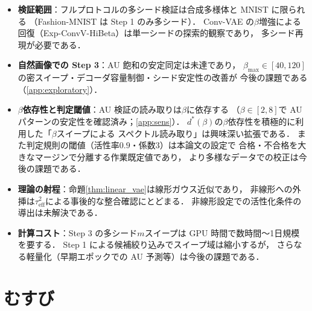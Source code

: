 \documentclass[11pt,a4paper]{jsarticle}
\newcommand{\dstar}{d^{*}(\beta)}
\begin{document}
\begin{itemize}
  \item \textbf{検証範囲}：フルプロトコルの多シード検証は合成多様体と MNIST に限られる
        （Fashion-MNIST は Step 1 のみ多シード）．
        Conv-VAE の$\beta$増強による回復（Exp-ConvV-HiBeta）は単一シードの探索的観察であり，
        多シード再現が必要である．
  \item \textbf{自然画像での Step 3}：AU 飽和の安定同定は未達であり，
        $\beta_{\max} \in [40, 120]$の密スイープ・デコーダ容量制御・シード安定性の改善が
        今後の課題である（\ref{app:exploratory}）．
  \item \textbf{$\beta$依存性と判定閾値}：AU 検証の読み取りは$\beta$に依存する
        （$\beta \in [2, 8]$で AU パターンの安定性を確認済み；\ref{app:sens}）．
        $\dstar$の$\beta$依存性を積極的に利用した「$\beta$スイープによる
        スペクトル読み取り」は興味深い拡張である．
        また判定規則の閾値（活性率$0.9$・係数$3$）は本論文の設定で
        合格・不合格を大きなマージンで分離する作業既定値であり，
        より多様なデータでの校正は今後の課題である．
  \item \textbf{理論の射程}：命題\ref{thm:linear_vae}は線形ガウス近似であり，
        非線形への外挿は$\tau^2_{\mathrm{eff}}$による事後的な整合確認にとどまる．
        非線形設定での活性化条件の導出は未解決である．
  \item \textbf{計算コスト}：Step 3 の多シード$m$スイープは GPU 時間で数時間〜1日規模を要する．
        Step 1 による候補絞り込みでスイープ域は縮小するが，
        さらなる軽量化（早期エポックでの AU 予測等）は今後の課題である．
\end{itemize}

\section{むすび}\label{sec:conclusion}
\end{document}
